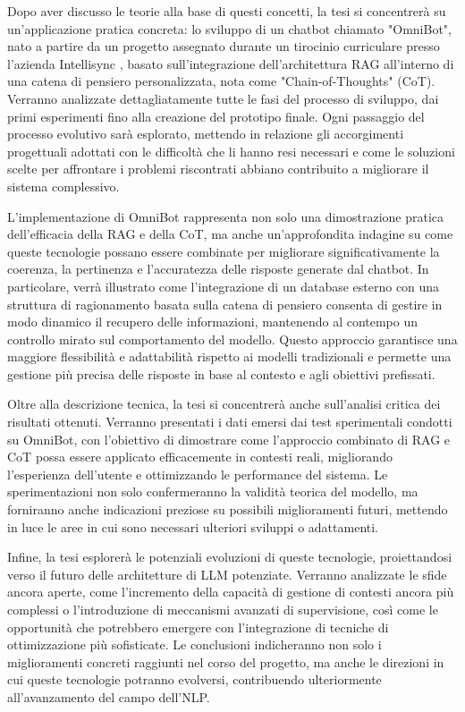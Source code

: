 Dopo aver discusso le teorie alla base di questi concetti, la tesi si concentrerà su un'applicazione pratica concreta: lo sviluppo di un chatbot chiamato "OmniBot", nato a partire da un progetto assegnato durante un tirocinio curriculare presso l'azienda Intellisync \cite{intellisync}, basato sull'integrazione dell'architettura RAG all'interno di una catena di pensiero personalizzata, nota come "Chain-of-Thoughts" (CoT). Verranno analizzate dettagliatamente tutte le fasi del processo di sviluppo, dai primi esperimenti fino alla creazione del prototipo finale. Ogni passaggio del processo evolutivo sarà esplorato, mettendo in relazione gli accorgimenti progettuali adottati con le difficoltà che li hanno resi necessari e come le soluzioni scelte per affrontare i problemi riscontrati abbiano contribuito a migliorare il sistema complessivo.

L'implementazione di OmniBot rappresenta non solo una dimostrazione pratica dell'efficacia della RAG e della CoT, ma anche un'approfondita indagine su come queste tecnologie possano essere combinate per migliorare significativamente la coerenza, la pertinenza e l'accuratezza delle risposte generate dal chatbot. In particolare, verrà illustrato come l'integrazione di un database esterno con una struttura di ragionamento basata sulla catena di pensiero consenta di gestire in modo dinamico il recupero delle informazioni, mantenendo al contempo un controllo mirato sul comportamento del modello. Questo approccio garantisce una maggiore flessibilità e adattabilità rispetto ai modelli tradizionali e permette una gestione più precisa delle risposte in base al contesto e agli obiettivi prefissati.

Oltre alla descrizione tecnica, la tesi si concentrerà anche sull'analisi critica dei risultati ottenuti. Verranno presentati i dati emersi dai test sperimentali condotti su OmniBot, con l'obiettivo di dimostrare come l'approccio combinato di RAG e CoT possa essere applicato efficacemente in contesti reali, migliorando l'esperienza dell'utente e ottimizzando le performance del sistema. Le sperimentazioni non solo confermeranno la validità teorica del modello, ma forniranno anche indicazioni preziose su possibili miglioramenti futuri, mettendo in luce le aree in cui sono necessari ulteriori sviluppi o adattamenti.

Infine, la tesi esplorerà le potenziali evoluzioni di queste tecnologie, proiettandosi verso il futuro delle architetture di LLM potenziate. Verranno analizzate le sfide ancora aperte, come l'incremento della capacità di gestione di contesti ancora più complessi o l'introduzione di meccanismi avanzati di supervisione, così come le opportunità che potrebbero emergere con l'integrazione di tecniche di ottimizzazione più sofisticate. Le conclusioni indicheranno non solo i miglioramenti concreti raggiunti nel corso del progetto, ma anche le direzioni in cui queste tecnologie potranno evolversi, contribuendo ulteriormente all'avanzamento del campo dell'NLP.